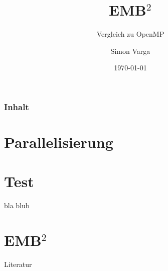 \documentclass[unknownkeysallowed,14pt]{beamer}
\title{EMB$ ^2$}
\subtitle{Vergleich zu OpenMP}
\date{\today}
\author{Simon Varga}
\institute[THI]{Technische Hochschule Ingolstadt}
\newcounter{ct}
\begin{document}
	

	\begin{frame}[plain]
		\titlepage
	\end{frame}
	
	\begin{frame}
		\frametitle{Inhalt}
	    \tableofcontents[hideallsubsections]
	\end{frame}
	
	\section{Parallelisierung}
	
	
	\section{Test}
	\begin{frame}
		bla
		\pause
		blub
	\end{frame}
	
	\section{EMB$ ^2$}
	
	
	\nocite{lehmann}
	\nocite{kohlhauser}
	\nocite{probst}
	
	
	\begin{frame}{Literatur}
		\small
		
	\end{frame}
\end{document}
